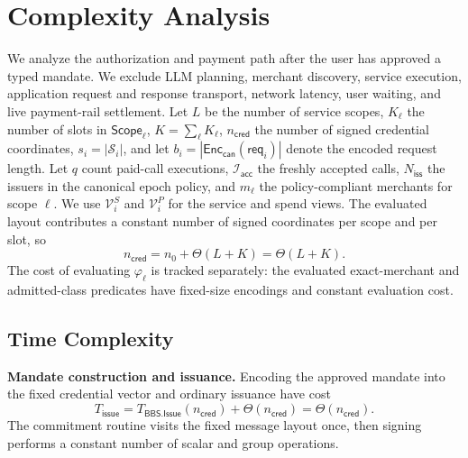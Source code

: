 \documentclass[letterpaper]{article}
\begin{document}
\section{Complexity Analysis}
\label{app:complexity}

We analyze the authorization and payment path after the user has approved a
typed mandate.  We exclude LLM planning, merchant discovery, service execution,
application request and response transport, network latency, user waiting, and
live payment-rail settlement.  Let \(L\) be the number of service scopes,
\(K_\ell\) the number of slots in \(\mathsf{Scope}_\ell\),
\(K=\sum_\ell K_\ell\), \(n_{\mathsf{cred}}\) the number of signed credential
coordinates, \(s_i=|\mathcal S_i|\), and let
\(b_i=|\mathsf{Enc}_{\mathsf{can}}(\mathsf{req}_i)|\) denote the encoded
request length.  Let \(q\) count paid-call executions,
\(\mathcal I_{\mathsf{acc}}\) the freshly accepted calls,
\(N_{\mathsf{iss}}\) the issuers in the canonical epoch policy, and \(m_\ell\)
the policy-compliant merchants for scope \(\ell\).  We use
\(\mathcal V_i^S\) and \(\mathcal V_i^P\) for the service and spend views.
The evaluated layout contributes a constant number of signed coordinates per
scope and per slot, so
\begin{equation}
n_{\mathsf{cred}}=n_0+\Theta(L+K)=\Theta(L+K).
\label{eq:complexity-credential-dimension}
\end{equation}
The cost of evaluating \(\varphi_\ell\) is tracked separately: the evaluated
exact-merchant and admitted-class predicates have fixed-size encodings and
constant evaluation cost.

\subsection{Time Complexity}

\textbf{Mandate construction and issuance.}
Encoding the approved mandate into the fixed credential vector and ordinary
issuance have cost
\begin{equation}
T_{\mathsf{issue}}
=T_{\mathsf{BBS.Issue}}(n_{\mathsf{cred}})+\Theta(n_{\mathsf{cred}})
=\Theta(n_{\mathsf{cred}}).
\label{eq:complexity-issue}
\end{equation}
The commitment routine visits the fixed message layout once,
then signing performs a constant number of scalar and group operations.
\end{document}
